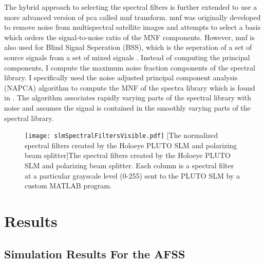 The hybrid approach to selecting the spectral filters is further extended to use a more advanced version of \gls{pca} called \acrfull{mnf} transform. \gls{mnf} was originally developed to remove noise from multispectral satellite images \cite{green1988transformation} and attempts to select a basis which orders the signal-to-noise ratio of the MNF components. However, \gls{mnf} is also used for Blind Signal Seperation (BSS), which is the seperation of a set of source signals from a set of mixed signals \cite{hundley2001solution}. Instead of computing the principal components, I compute the maximum noise fraction components of the spectral library. I specifically used the noise adjusted principal component analysis (NAPCA) algorithm to compute the MNF of the spectra library which is found in \cite{hundley2001solution}. The algorithm associates rapidly varying parts of the spectral library with noise and assumes the signal is contained in the smoothly varying parts of the spectral library. 

\begin{figure}[H]
	\centering
	\texttt{[image: slmSpectralFiltersVisible.pdf]}
	[The normalized spectral filters created by the Holoeye PLUTO SLM and polarizing beam splitter]{The spectral filters created by the Holoeye PLUTO SLM and polarizing beam splitter. Each column is a spectral filter at a particular grayscale level (0-255) sent to the PLUTO SLM by a custom MATLAB program. }
	\label{fig:slmSpectralFiltersVisible}
\end{figure}


\section{Results}

\subsection{Simulation Results For the AFSS}

